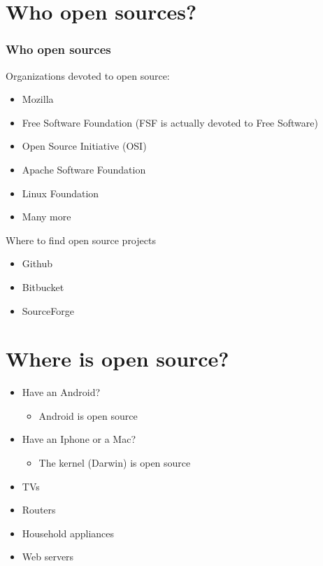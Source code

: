 \documentclass[8pt]{beamer}
\begin{document}
\section{Who open sources?}
\begin{frame}
	\frametitle{Who open sources}
	Organizations devoted to open source:
	\begin{itemize}
		\item Mozilla
		\item Free Software Foundation (FSF is actually devoted to Free Software)
		\item Open Source Initiative (OSI)
		\item Apache Software Foundation
		\item Linux Foundation
		\item Many more
	\end{itemize}
	Where to find open source projects
	\begin{itemize}
		\item Github
		\item Bitbucket
		\item SourceForge
	\end{itemize}
\end{frame}

\section{Where is open source?}
\begin{frame}
	\begin{itemize}
		\item Have an Android? \begin{itemize}
				\item Android is open source
			\end{itemize}
		\item Have an Iphone or a Mac? \begin{itemize}
				\item The kernel (Darwin) is open source
			\end{itemize}
		\item TVs
		\item Routers
		\item Household appliances
		\item Web servers
	\end{itemize}
\end{frame}
\end{document}
